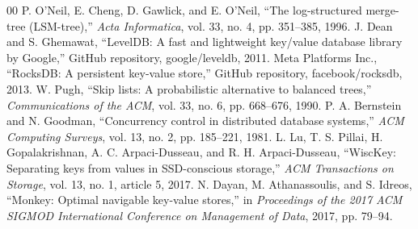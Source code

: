 \documentclass[conference]{IEEEtran}
\begin{document}
\begin{thebibliography}{00}
 P. O'Neil, E. Cheng, D. Gawlick, and E. O'Neil, ``The log-structured merge-tree (LSM-tree),'' \emph{Acta Informatica}, vol. 33, no. 4, pp. 351--385, 1996.
 J. Dean and S. Ghemawat, ``LevelDB: A fast and lightweight key/value database library by Google,'' GitHub repository, google/leveldb, 2011.
 Meta Platforms Inc., ``RocksDB: A persistent key-value store,'' GitHub repository, facebook/rocksdb, 2013.
 W. Pugh, ``Skip lists: A probabilistic alternative to balanced trees,'' \emph{Communications of the ACM}, vol. 33, no. 6, pp. 668--676, 1990.
 P. A. Bernstein and N. Goodman, ``Concurrency control in distributed database systems,'' \emph{ACM Computing Surveys}, vol. 13, no. 2, pp. 185--221, 1981.
 L. Lu, T. S. Pillai, H. Gopalakrishnan, A. C. Arpaci-Dusseau, and R. H. Arpaci-Dusseau, ``WiscKey: Separating keys from values in SSD-conscious storage,'' \emph{ACM Transactions on Storage}, vol. 13, no. 1, article 5, 2017.
 N. Dayan, M. Athanassoulis, and S. Idreos, ``Monkey: Optimal navigable key-value stores,'' in \emph{Proceedings of the 2017 ACM SIGMOD International Conference on Management of Data}, 2017, pp. 79--94.
\end{thebibliography}
\end{document}
